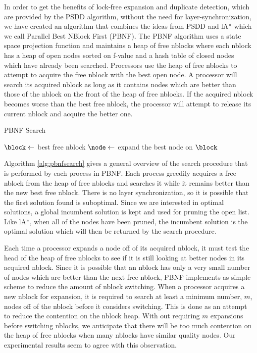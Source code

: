 \documentclass{article}
\begin{document}
In order to get the benefits of lock-free expansion and duplicate
detection, which are provided by the PSDD algorithm, without the need
for layer-synchronization, we have created an algorithm that combines
the ideas from PSDD and lA* which we call Parallel Best NBlock First
(PBNF).  The PBNF algorithm uses a state space projection function and
maintains a heap of free nblocks where each nblock has a heap of open
nodes sorted on f-value and a hash table of closed nodes which have
already been searched.  Processors use the heap of free nblocks to
attempt to acquire the free nblock with the best open node.  A
processor will search its acquired nblock as long as it contains nodes
which are better than those of the nblock on the front of the heap of
free nblocks.  If the acquired nblock becomes worse than the best free
nblock, the processor will attempt to release its current nblock and
acquire the better one.

\begin{algorithm}
  \caption{PBNF Search}
  \label{alg:pbnfsearch}
   {
    $\block \leftarrow$ best free nblock\;
     {
      $\node \leftarrow$ expand the best node on $\block$\;
    }
  }
\end{algorithm}

Algorithm \ref{alg:pbnfsearch} gives a general overview of the search
procedure that is performed by each process in PBNF.  Each process
greedily acquires a free nblock from the heap of free nblocks and
searches it while it remains better than the new best free nblock.
There is no layer synchronization, so it is possible that the first
solution found is suboptimal.  Since we are interested in optimal
solutions, a global incumbent solution is kept and used for pruning
the open list.  Like lA*, when all of the nodes have been pruned, the
incumbent solution is the optimal solution which will then be returned
by the search procedure.

Each time a processor expands a node off of its acquired nblock, it
must test the head of the heap of free nblocks to see if it is still
looking at better nodes in its acquired nblock.  Since it is possible
that an nblock has only a very small number of nodes which are better
than the next free nblock, PBNF implements as simple scheme to reduce
the amount of nblock switching.  When a processor acquires a new
nblock for expansion, it is required to search at least a minimum number,
$m$, nodes off of the nblock before it considers switching.  This is
done as an attempt to reduce the contention on the nblock heap.  With
out requiring $m$ expansions before switching nblocks, we anticipate
that there will be too much contention on the heap of free nblocks
when many nblocks have similar quality nodes.  Our experimental
results seem to agree with this observation.
\end{document}
